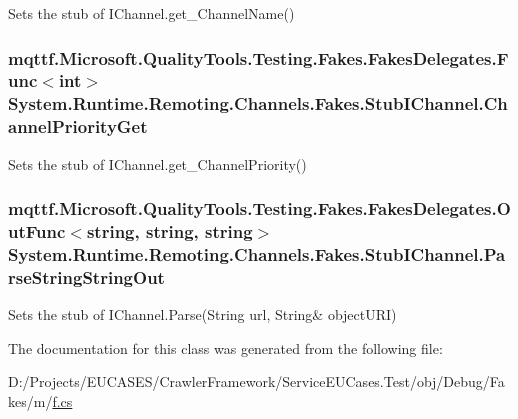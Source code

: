 Sets the stub of I\-Channel.\-get\-\_\-\-Channel\-Name()

\hypertarget{class_system_1_1_runtime_1_1_remoting_1_1_channels_1_1_fakes_1_1_stub_i_channel_a3d09e8088a886e82a9e36b8b01f8d61f}{
\subsubsection[{Channel\-Priority\-Get}]{\setlength{\rightskip}{0pt plus 5cm}mqttf.\-Microsoft.\-Quality\-Tools.\-Testing.\-Fakes.\-Fakes\-Delegates.\-Func$<$int$>$ System.\-Runtime.\-Remoting.\-Channels.\-Fakes.\-Stub\-I\-Channel.\-Channel\-Priority\-Get}}\label{class_system_1_1_runtime_1_1_remoting_1_1_channels_1_1_fakes_1_1_stub_i_channel_a3d09e8088a886e82a9e36b8b01f8d61f}


Sets the stub of I\-Channel.\-get\-\_\-\-Channel\-Priority()

\hypertarget{class_system_1_1_runtime_1_1_remoting_1_1_channels_1_1_fakes_1_1_stub_i_channel_acc7b72663718e34414573afd8e38df87}{
\subsubsection[{Parse\-String\-String\-Out}]{\setlength{\rightskip}{0pt plus 5cm}mqttf.\-Microsoft.\-Quality\-Tools.\-Testing.\-Fakes.\-Fakes\-Delegates.\-Out\-Func$<$string, string, string$>$ System.\-Runtime.\-Remoting.\-Channels.\-Fakes.\-Stub\-I\-Channel.\-Parse\-String\-String\-Out}}\label{class_system_1_1_runtime_1_1_remoting_1_1_channels_1_1_fakes_1_1_stub_i_channel_acc7b72663718e34414573afd8e38df87}


Sets the stub of I\-Channel.\-Parse(String url, String\& object\-U\-R\-I)



The documentation for this class was generated from the following file\-:\begin{DoxyCompactItemize}
\item 
D\-:/\-Projects/\-E\-U\-C\-A\-S\-E\-S/\-Crawler\-Framework/\-Service\-E\-U\-Cases.\-Test/obj/\-Debug/\-Fakes/m/\hyperlink{m_2f_8cs}{f.\-cs}\end{DoxyCompactItemize}
